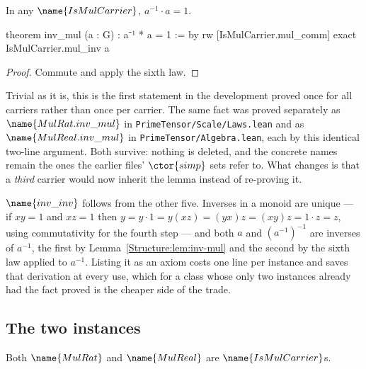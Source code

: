 \begin{lemma}\label{Structure:lem:inv-mul}
In any $\name{IsMulCarrier}$, $a^{-1} \cdot a = 1$.
\end{lemma}

\begin{leancode}
theorem inv_mul (a : G) : a⁻¹ * a = 1 := by
  rw [IsMulCarrier.mul_comm]
  exact IsMulCarrier.mul_inv a
\end{leancode}

\begin{proof}
Commute and apply the sixth law.
\end{proof}

\begin{remark}\label{Structure:rem:generic}
Trivial as it is, this is the first statement in the development proved once
for all carriers rather than once per carrier.  The same fact was proved
separately as $\name{MulRat.inv\_mul}$ in
\texttt{PrimeTensor/Scale/Laws.lean} and as $\name{MulReal.inv\_mul}$ in
\texttt{PrimeTensor/Algebra.lean}, each by this identical two-line argument.
Both survive: nothing is deleted, and the concrete names remain the ones the
earlier files' $\ctor{simp}$ sets refer to.  What changes is that a
\emph{third} carrier would now inherit the lemma instead of re-proving it.
\end{remark}

\begin{remark}\label{Structure:rem:redundant}
$\name{inv\_inv}$ follows from the other five.  Inverses in a monoid are
unique --- if $xy = 1$ and $xz = 1$ then
$y = y\cdot 1 = y(xz) = (yx)z = (xy)z = 1\cdot z = z$, using commutativity for
the fourth step --- and both $a$ and $(a^{-1})^{-1}$ are inverses of $a^{-1}$,
the first by Lemma~\ref{Structure:lem:inv-mul} and the second by the sixth law
applied to $a^{-1}$.  Listing it as an axiom costs one line per instance and
saves that derivation at every use, which for a class whose only two instances
already had the fact proved is the cheaper side of the trade.
\end{remark}

\subsection{The two instances}

\begin{proposition}
\label{Structure:prop:instances}
Both $\name{MulRat}$ and $\name{MulReal}$ are $\name{IsMulCarrier}$s.
\end{proposition}

